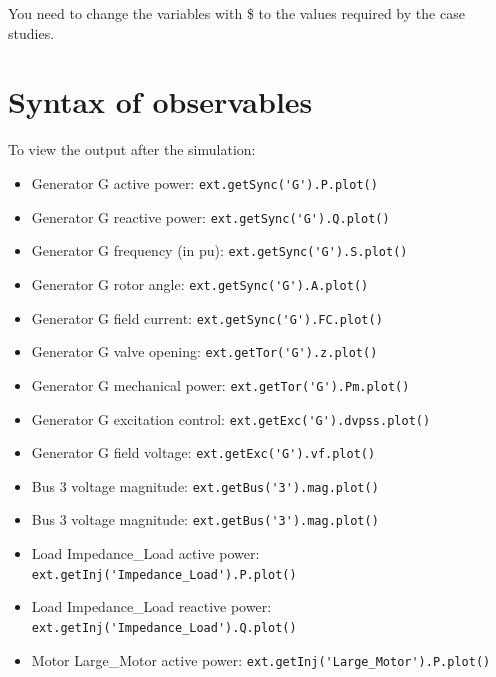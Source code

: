 \documentclass[a4paper,11pt,oneside,onecolumn]{article}
\newcommand\textcode{\Verb}
\begin{document}
\noindent You need to change the variables with \$ to the values required by the case studies.

\section{Syntax of observables}

To view the output after the simulation:

\begin{itemize}
	\item Generator G active power: 	
	\textcode|ext.getSync('G').P.plot()|
	
	\item Generator G reactive power: 	
	\textcode|ext.getSync('G').Q.plot()|
	
	\item Generator G frequency (in pu): 	
	\textcode|ext.getSync('G').S.plot()|
	
	\item Generator G rotor angle: 	
	\textcode|ext.getSync('G').A.plot()|
	
	\item Generator G field current: 	
	\textcode|ext.getSync('G').FC.plot()|
		
	\item Generator G valve opening: 	
	\textcode|ext.getTor('G').z.plot()|
	
	\item Generator G mechanical power: 	
	\textcode|ext.getTor('G').Pm.plot()|
	
	\item Generator G excitation control: \textcode|ext.getExc('G').dvpss.plot()|
	
	\item Generator G field voltage: 	
	\textcode|ext.getExc('G').vf.plot()|
	
	\item Bus 3 voltage magnitude:	
	\textcode|ext.getBus('3').mag.plot()|
	
	\item Bus 3 voltage magnitude:	
	\textcode|ext.getBus('3').mag.plot()|
	
	\item Load Impedance\_Load active power: 	
	\textcode|ext.getInj('Impedance_Load').P.plot()|
	
	\item Load Impedance\_Load reactive power: 	
	\textcode|ext.getInj('Impedance_Load').Q.plot()|
	
	\item Motor Large\_Motor active power: 	
	\textcode|ext.getInj('Large_Motor').P.plot()|
	

\end{itemize}
\end{document}
